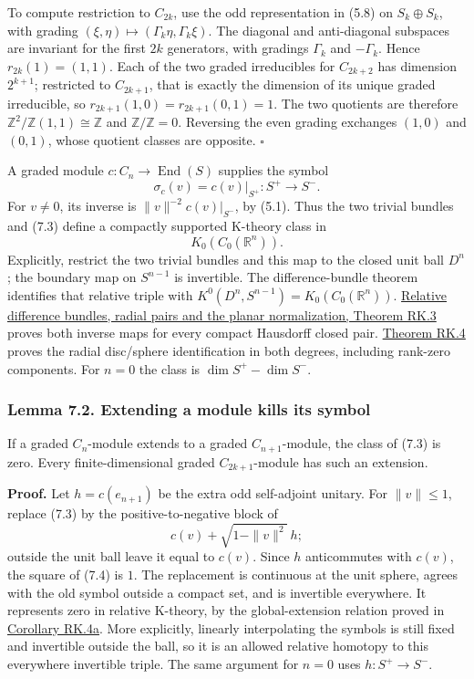 \documentclass[
  11pt,
]{article}
\begin{document}
To compute restriction to \(C_{2k}\), use the odd representation in
(5.8) on \(S_k\oplus S_k\), with grading
\((\xi,\eta)\mapsto(\Gamma_k\eta,\Gamma_k\xi)\). The diagonal and
anti-diagonal subspaces are invariant for the first \(2k\) generators,
with gradings \(\Gamma_k\) and \(-\Gamma_k\). Hence \(r_{2k}(1)=(1,1)\).
Each of the two graded irreducibles for \(C_{2k+2}\) has dimension
\(2^{k+1}\); restricted to \(C_{2k+1}\), that is exactly the dimension
of its unique graded irreducible, so \(r_{2k+1}(1,0)=r_{2k+1}(0,1)=1\).
The two quotients are therefore
\(\mathbb Z^2/\mathbb Z(1,1)\cong\mathbb Z\) and
\(\mathbb Z/\mathbb Z=0\). Reversing the even grading exchanges
\((1,0)\) and \((0,1)\), whose quotient classes are opposite.
\(\square\)

A graded module \(c:C_n\to\operatorname{End}(S)\) supplies the symbol \[
\sigma_c(v)=c(v)|_{S^+}:S^+\to S^-.
\tag{7.3}
\] For \(v\ne0\), its inverse is \(\|v\|^{-2}c(v)|_{S^-}\), by (5.1).
Thus the two trivial bundles and (7.3) define a compactly supported
K-theory class in \[
K_0(C_0(\mathbb R^n)).
\] Explicitly, restrict the two trivial bundles and this map to the
closed unit ball \(D^n\); the boundary map on \(S^{n-1}\) is invertible.
The difference-bundle theorem identifies that relative triple with
\(K^0(D^n,S^{n-1})=K_0(C_0(\mathbb R^n))\).
\href{supporting/relative-k-foundations/relative-k-foundations.html\#rk-difference}{Relative
difference bundles, radial pairs and the planar normalization, Theorem
RK.3} proves both inverse maps for every compact Hausdorff closed pair.
\href{supporting/relative-k-foundations/relative-k-foundations.html\#rk-radial}{Theorem
RK.4} proves the radial disc/sphere identification in both degrees,
including rank-zero components. For \(n=0\) the class is
\(\dim S^+-\dim S^-\).

\subsubsection{Lemma 7.2. Extending a module kills its
symbol}\label{lemma-7.2.-extending-a-module-kills-its-symbol}

If a graded \(C_n\)-module extends to a graded \(C_{n+1}\)-module, the
class of (7.3) is zero. Every finite-dimensional graded
\(C_{2k+1}\)-module has such an extension.

\textbf{Proof.} Let \(h=c(e_{n+1})\) be the extra odd self-adjoint
unitary. For \(\|v\|\leq1\), replace (7.3) by the positive-to-negative
block of \[
c(v)+\sqrt{1-\|v\|^2}\,h;
\tag{7.4}
\] outside the unit ball leave it equal to \(c(v)\). Since \(h\)
anticommutes with \(c(v)\), the square of (7.4) is \(1\). The
replacement is continuous at the unit sphere, agrees with the old symbol
outside a compact set, and is invertible everywhere. It represents zero
in relative K-theory, by the global-extension relation proved in
\href{supporting/relative-k-foundations/relative-k-foundations.html\#rk-symbol-rules}{Corollary
RK.4a}. More explicitly, linearly interpolating the symbols is still
fixed and invertible outside the ball, so it is an allowed relative
homotopy to this everywhere invertible triple. The same argument for
\(n=0\) uses \(h:S^+\to S^-\).
\end{document}
